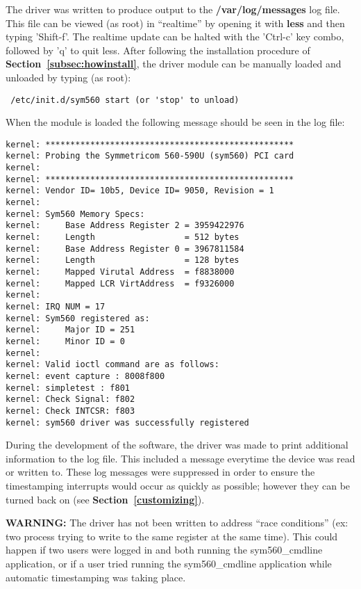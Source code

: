 \documentclass[11pt]{article}
\begin{document}
The driver was written to produce output to the \textbf{/var/log/messages} log file.  This file can be viewed (as root) in ``realtime'' by opening it with \textbf{less} and then typing 'Shift-f'.  The realtime update can be halted with the 'Ctrl-c' key combo, followed by 'q' to quit less.  After following the installation procedure of \textbf{Section~\ref{subsec:howinstall}}, the driver module can be manually loaded and unloaded by typing (as root):
\begin{verbatim}
 /etc/init.d/sym560 start (or 'stop' to unload)
\end{verbatim}
When the module is loaded the following message should be seen in the log file:
\begin{small}
\begin{verbatim}
kernel: **************************************************
kernel: Probing the Symmetricom 560-590U (sym560) PCI card
kernel:
kernel: **************************************************
kernel: Vendor ID= 10b5, Device ID= 9050, Revision = 1
kernel:
kernel: Sym560 Memory Specs:
kernel:     Base Address Register 2 = 3959422976
kernel:     Length                  = 512 bytes
kernel:     Base Address Register 0 = 3967811584
kernel:     Length                  = 128 bytes
kernel:     Mapped Virutal Address  = f8838000
kernel:     Mapped LCR VirtAddress  = f9326000
kernel:
kernel: IRQ NUM = 17
kernel: Sym560 registered as:
kernel:     Major ID = 251
kernel:     Minor ID = 0
kernel:
kernel: Valid ioctl command are as follows:
kernel: event capture : 8008f800
kernel: simpletest : f801
kernel: Check Signal: f802
kernel: Check INTCSR: f803
kernel: sym560 driver was successfully registered
   \end{verbatim}
\end{small}

During the development of the software, the driver was made to print additional information to the log file.  This included a message everytime the device was read or written to.  These log messages were suppressed in order to ensure the timestamping interrupts would occur as quickly as possible; however they can be turned back on (see \textbf{Section~\ref{customizing}}).

\noindent \textbf{WARNING:} The driver has not been written to address ``race conditions'' (ex: two process trying to write to the same register at the same time).  This could happen if two users were logged in and both running the sym560\_cmdline application, or if a user tried running the sym560\_cmdline application while automatic timestamping was taking place. 
\end{document}
